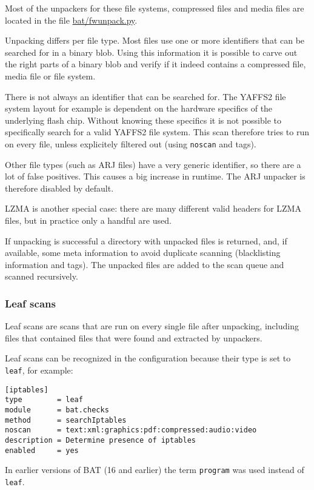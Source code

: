 \documentclass[10pt]{article}
\begin{document}
Most of the unpackers for these file systems, compressed files and media files
are located in the file \url{bat/fwunpack.py}.

Unpacking differs per file type. Most files use one or more identifiers that
can be searched for in a binary blob. Using this information it is possible
to carve out the right parts of a binary blob and verify if it indeed contains
a compressed file, media file or file system.

There is not always an identifier that can be searched for. The YAFFS2 file
system layout for example is dependent on the hardware specifics of the
underlying flash chip. Without knowing these specifics it is not possible to
specifically search for a valid YAFFS2 file system. This scan therefore tries
to run on every file, unless explicitely filtered out (using \texttt{noscan}
and tags).

Other file types (such as ARJ files) have a very generic identifier, so there
are a lot of false positives. This causes a big increase in runtime. The ARJ
unpacker is therefore disabled by default.

LZMA is another special case: there are many different valid headers for LZMA
files, but in practice only a handful are used.

If unpacking is successful a directory with unpacked files is returned, and, if
available, some meta information to avoid duplicate scanning (blacklisting
information and tags). The unpacked files are added to the scan queue and
scanned recursively.

\subsubsection{Leaf scans}

Leaf scans are scans that are run on every single file after unpacking,
including files that contained files that were found and extracted by unpackers.

Leaf scans can be recognized in the configuration because their type is set to
\texttt{leaf}, for example:

\begin{verbatim}
[iptables]
type        = leaf
module      = bat.checks
method      = searchIptables
noscan      = text:xml:graphics:pdf:compressed:audio:video
description = Determine presence of iptables
enabled     = yes
\end{verbatim}

In earlier versions of BAT (16 and earlier) the term \texttt{program} was used
instead of \texttt{leaf}.
\end{document}
